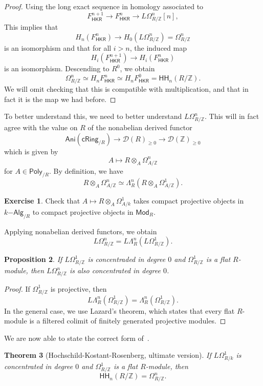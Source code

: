 \documentclass[10pt, oneside]{memoir}
\newtheorem{thm}{Theorem}[subsection]
\newtheorem{prop}[thm]{Proposition}
\theoremstyle{definition}
\newtheorem{exer}[thm]{Exercise}
\theoremstyle{remark}
\theoremstyle{plain}
\theoremstyle{definition}
\theoremstyle{remark}
\newcommand{\Z}{\mathbb{Z}}
\newcommand{\mc}[1]{\mathcal{#1}}
\newcommand{\ms}[1]{\mathsf{#1}}
\newcommand{\1}{\mathbf{1}}
\newcommand{\2}{\mathbf{2}}
\newcommand{\3}{\mathbf{3}}
\newcommand{\HH}{\ms{HH}}
\begin{document}
\begin{proof}
    Using the long exact sequence in homology associated to
    \[ F_{\ms{HKR}}^{n+1} \to F_{\ms{HKR}}^n \to L\Omega^n_{R/\Z}[n], \]
    This implies that
    \[ H_n (F^n_{\ms{HKR}}) \to H_0(L\Omega^n_{R/\Z}) = \Omega^n_{R/\Z} \]
    is an isomorphism and that for all $i > n$, the induced map
    \[ H_i(F^{n+1}_{\ms{HKR}}) \to H_i(F^n_{\ms{HKR}}) \]
    is an isomorphism. Descending to $R^0$, we obtain
    \[ \Omega^n_{R/\Z} \simeq H_n F_{\ms{HKR}}^n \simeq H_n F^0_{\ms{HKR}} = \HH_n(R/\Z). \]
    We will omit checking that this is compatible with multiplication, and that in fact it is the map we had before.
\end{proof}

To better understand this, we need to better understand $L\Omega^n_{R/\Z}$. This will in fact agree with the value on $R$ of the nonabelian derived functor
\[ \ms{Ani}(\ms{cRing}_{/R}) \to \mc{D}(R)_{\geq 0} \to \mc{D}(\Z)_{\geq 0} \]
which is given by
\[ A \mapsto R \otimes_A \Omega_{A/\Z}^n \]
for $A \in \ms{Poly}_{/R}$. By definition, we have
\[ R \otimes_A \Omega^n_{A/\Z} \simeq \Lambda_R^n (R \otimes_A \Omega^1_{A/\Z}). \]
\begin{exer}
    Check that $A \mapsto R \otimes_A \Omega^1_{A/k}$ takes compact projective objects in $k\ms{-Alg}_{/R}$ to compact projective objects in $\ms{Mod}_R$.
\end{exer}
Applying nonabelian derived functors, we obtain
\[ L\Omega^n_{R/\Z} = L \Lambda^n_R (L \Omega^1_{R/\Z}). \]

\begin{prop}
    If $L\Omega^1_{R/\Z}$ is concentraded in degree $0$ and $\Omega^1_{R/\Z}$ is a flat $R$-module, then $L\Omega^n_{R/\Z}$ is also concentrated in degree $0$.
\end{prop}

\begin{proof}
    If $\Omega^1_{R/\Z}$ is projective, then
    \[ L \Lambda_R^n (\Omega^1_{R/\Z}) = \Lambda^n_R (\Omega^1_{R/\Z}). \]
    In the general case, we use Lazard's theorem, which states that every flat $R$-module is a filtered colimit of finitely generated projective modules.
\end{proof}

We are now able to state the correct form of~.
\begin{thm}[Hochschild-Kostant-Rosenberg, ultimate version]\label{thm:hkr2}
    If $L\Omega^1_{R/k}$ is concentrated in degree $0$ and $\Omega^1_{R/\Z}$ is a flat $R$-module, then
    \[ \HH_n(R/\Z) = \Omega^n_{R/\Z}. \]
\end{thm}
\end{document}
